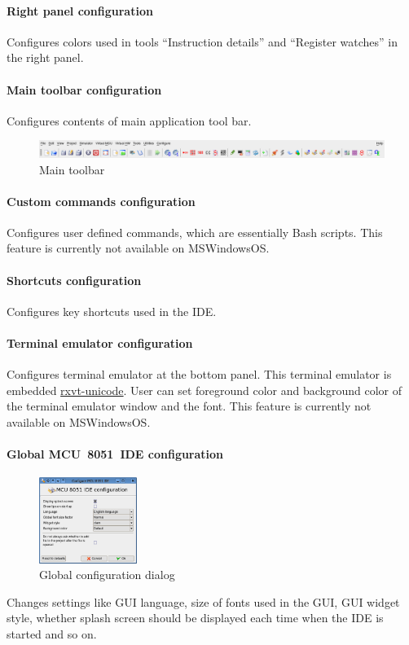 \documentclass[a4paper,twoside,12pt]{book}
\begin{document}
		\paragraph{Right panel configuration}
			Configures colors used in tools ``Instruction details'' and ``Register watches'' in the right panel.

		\paragraph{Main toolbar configuration}
			Configures contents of main application tool bar.
			\begin{figure}[h!]
				\centering{}
				\includegraphics[width=\textwidth]{img/041.png}
				\caption{Main toolbar}
			\end{figure}

		\paragraph{Custom commands configuration}
			Configures user defined commands, which are essentially Bash scripts. This feature is currently not available on MS\textregistered Windows\textregistered OS.

		\paragraph{Shortcuts configuration}
			Configures key shortcuts used in the IDE.

		\paragraph{Terminal emulator configuration}
			Configures terminal emulator at the bottom panel. This terminal emulator is embedded \href{http://software.schmorp.de/pkg/rxvt-unicode.html}{rxvt-unicode}. User can set foreground color and background color of the terminal emulator window and the font. This feature is currently not available on MS\textregistered Windows\textregistered OS.

		\paragraph{Global MCU~8051~IDE configuration}
			\begin{figure}
				\centering{}
				\includegraphics[width=90pt]{img/028.png}
				\caption{Global configuration dialog}
			\end{figure}
			Changes settings like GUI language, size of fonts used in the GUI, GUI widget style, whether splash screen should be displayed each time when the IDE is started and so on.
\end{document}
